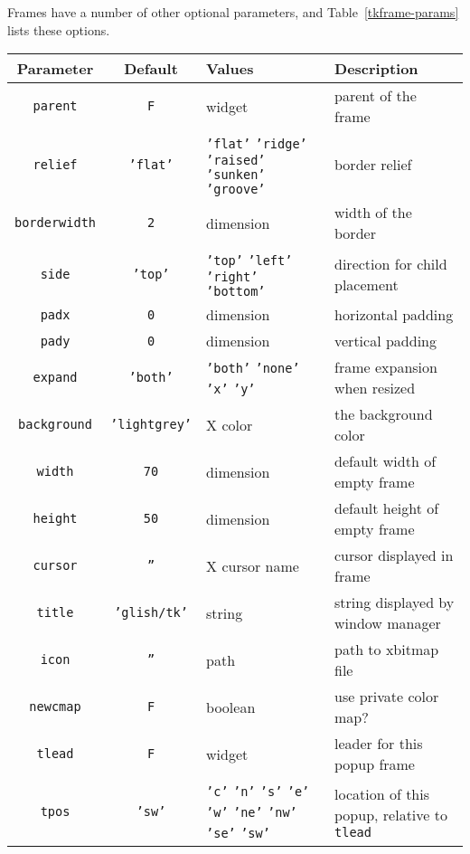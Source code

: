 Frames have a number of other optional parameters, and Table~\ref{tkframe-params}
lists these options.
\begin{table}[tbh]
{\small
\begin{center}
\begin{tabular}{|c|c|p{1.7in}|p{1.8in}|}
\hline
Parameter & Default & Values & Description \\
\hline
\hline
{\tt parent}            & {\tt F}       & widget & parent of the frame \\ \hline
{\tt relief}            & {\tt 'flat'}  & {\tt 'flat'} {\tt 'ridge'} {\tt 'raised'} {\tt 'sunken'} {\tt 'groove'} & border relief \\ \hline
{\tt borderwidth}       & {\tt 2}       & dimension & width of the border \\ \hline
{\tt side}              & {\tt 'top'}   & {\tt 'top'} {\tt 'left'} {\tt 'right'} {\tt 'bottom'} & direction for child placement \\ \hline
{\tt padx}              & {\tt 0}       & dimension & horizontal padding \\ \hline
{\tt pady}              & {\tt 0}       & dimension & vertical padding \\ \hline
{\tt expand}            & {\tt 'both'}  & {\tt 'both'} {\tt 'none'} {\tt 'x'} {\tt 'y'} & frame expansion when resized \\ \hline
{\tt background}        & {\tt 'lightgrey'}& X color & the background color \\ \hline
{\tt width}             & {\tt 70}      & dimension & default width of empty frame \\ \hline
{\tt height}            & {\tt 50}      & dimension & default height of empty frame \\ \hline
{\tt cursor}            & {\tt ''}      & X cursor name & cursor displayed in frame \\ \hline
{\tt title}             & {\tt 'glish/tk'}& string & string displayed by window manager \\ \hline
{\tt icon}              & {\tt ''}      & path & path to xbitmap file \\ \hline
{\tt newcmap}           & {\tt F}       & boolean & use private color map? \\ \hline
{\tt tlead}             & {\tt F}       & widget & leader for this popup frame \\ \hline
{\tt tpos}              & {\tt 'sw'}    & {\tt 'c'} {\tt 'n'} {\tt 's'} {\tt 'e'} {\tt 'w'} {\tt 'ne'} {\tt 'nw'} {\tt 'se'} {\tt 'sw'} & location of this popup, relative to {\tt tlead} \\ \hline

\end{tabular}
\end{center}}
\end{table}
